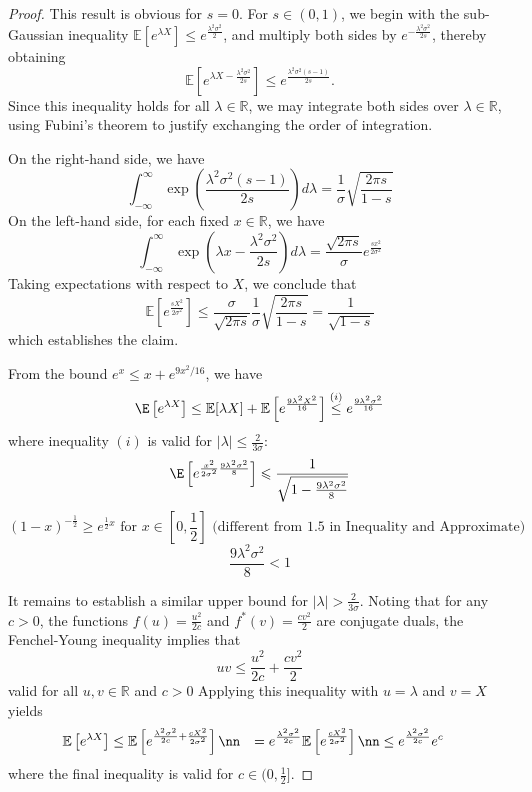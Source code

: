 \documentclass{article}
\begin{document}
\begin{proof}
 This result is obvious for $s=0$. For $s \in(0,1)$, we begin with the sub-Gaussian inequality $\mathbb{E}\left[e^{\lambda X}\right] \leq e^{\frac{\lambda^{2} \sigma^{2}}{2}}$, and multiply both sides by $e^{-\frac{\lambda^{2} \sigma^{2}}{2 s}}$, thereby obtaining
$$
\mathbb{E}\left[e^{\lambda X-\frac{\lambda^{2} \sigma^{2}}{2 s}}\right] \leq e^{\frac{\lambda^{2} \sigma^{2}(s-1)}{2 s}} .
$$
Since this inequality holds for all $\lambda \in \mathbb{R}$, we may integrate both sides over $\lambda \in \mathbb{R}$, using Fubini's theorem to justify exchanging the order of integration.

On the right-hand side, we have
$$
\int_{-\infty}^{\infty} \exp \left(\frac{\lambda^{2} \sigma^{2}(s-1)}{2 s}\right) d \lambda=\frac{1}{\sigma} \sqrt{\frac{2 \pi s}{1-s}}
$$
On the left-hand side, for each fixed $x \in \mathbb{R}$, we have
$$
\int_{-\infty}^{\infty} \exp \left(\lambda x-\frac{\lambda^{2} \sigma^{2}}{2 s}\right) d \lambda=\frac{\sqrt{2 \pi s}}{\sigma} e^{\frac{s x^{2}}{2 \sigma^{2}}}
$$
Taking expectations with respect to $X$, we conclude that
$$
\mathbb{E}\left[e^{\frac{s X^{2}}{2 \sigma^{2}}}\right] \leq \frac{\sigma}{\sqrt{2 \pi s}} \frac{1}{\sigma} \sqrt{\frac{2 \pi s}{1-s}}=\frac{1}{\sqrt{1-s}}
$$
which establishes the claim.

 From the bound $e^{x} \leq x+e^{9 x^{2} / 16}$, we have
\begin{align}
\E\left[e^{\lambda X}\right] \leq \mathbb{E}[\lambda X]+\mathbb{E}\left[e^{\frac{9 \lambda^{2} X^{2}}{16}}\right] \stackrel{(i)}{\leq} e^{\frac{9 \lambda^{2} \sigma^{2}}{16}}\label{eq:b}
\end{align}
where inequality $(i)$ is valid for $|\lambda| \le \frac{2}{3\sigma}$:
$$\E\left[e^{\frac{x^{2}}{2\sigma^{2}} \frac{9\lambda^{2}\sigma^{2}}{8}}\right] \leqslant \frac{1}{\sqrt{1-\frac{9\lambda^{2}\sigma^{2}}{8}}}$$
$$(1-x)^{-\frac{1}{2}}\ge e^{\frac{1}{2}x} \text{ for $x\in [0,\frac{1}{2}]$} \text{ (different from 1.5 in Inequality and Approximate)} $$
$$\frac{9\lambda^{2}\sigma^{2}}{8}<1$$

It remains to establish a similar upper bound for $|\lambda|>\frac{2}{3 \sigma}$. Noting that for any $c>0$, the functions $f(u)=\frac{u^{2}}{2 c}$ and $f^{*}(v)=\frac{c v^{2}}{2}$ are conjugate duals, the Fenchel-Young inequality implies that
$$
u v \leq \frac{u^{2}}{2 c}+\frac{c v^{2}}{2}
$$
valid for all $u, v \in \mathbb{R}$ and $c>0$
Applying this inequality with $u=\lambda$ and $v=X$ yields
\begin{align}
\mathbb{E}\left[e^{\lambda X}\right] & \leq \mathbb{E}\left[e^{\frac{\lambda^{2} \sigma^{2}}{2 c}+\frac{c X^{2}}{2 \sigma^{2}}}\right] \nn
&=e^{\frac{\lambda^{2} \sigma^{2}}{2 c}} \mathbb{E}\left[e^{\frac{c X^{2}}{2 \sigma^{2}}}\right] \nn
& \le e^{\frac{\lambda^{2} \sigma^{2}}{2 c}} e^{c} \label{eq:a}
\end{align}
where the final inequality is valid for $c\in (0,\frac{1}{2}]$. 


\end{proof}
\end{document}
